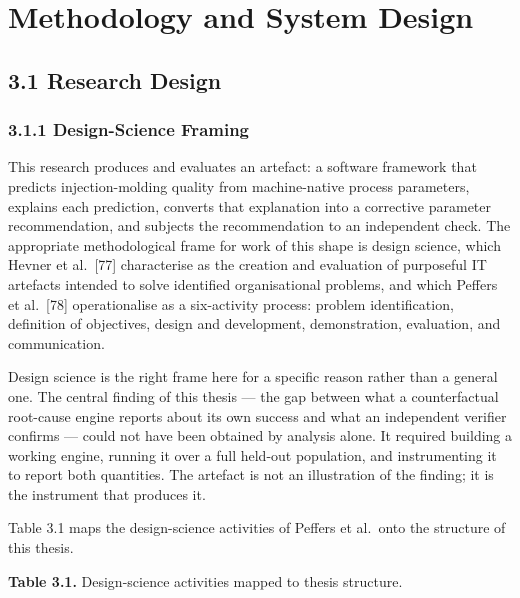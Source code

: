 \hypertarget{methodology-and-system-design}{%
\chapter{Methodology and System Design}\label{methodology-and-system-design}}

\hypertarget{research-design}{%
\section{3.1 Research Design}\label{research-design}}

\hypertarget{design-science-framing}{%
\subsection{3.1.1 Design-Science Framing}\label{design-science-framing}}

This research produces and evaluates an artefact: a software framework that predicts injection-molding quality from machine-native process parameters, explains each prediction, converts that explanation into a corrective parameter recommendation, and subjects the recommendation to an independent check. The appropriate methodological frame for work of this shape is design science, which Hevner et al.~{[}77{]} characterise as the creation and evaluation of purposeful IT artefacts intended to solve identified organisational problems, and which Peffers et al.~{[}78{]} operationalise as a six-activity process: problem identification, definition of objectives, design and development, demonstration, evaluation, and communication.

Design science is the right frame here for a specific reason rather than a general one. The central finding of this thesis --- the gap between what a counterfactual root-cause engine reports about its own success and what an independent verifier confirms --- could not have been obtained by analysis alone. It required building a working engine, running it over a full held-out population, and instrumenting it to report both quantities. The artefact is not an illustration of the finding; it is the instrument that produces it.

Table 3.1 maps the design-science activities of Peffers et al.~onto the structure of this thesis.

\textbf{Table 3.1.} Design-science activities mapped to thesis structure.

